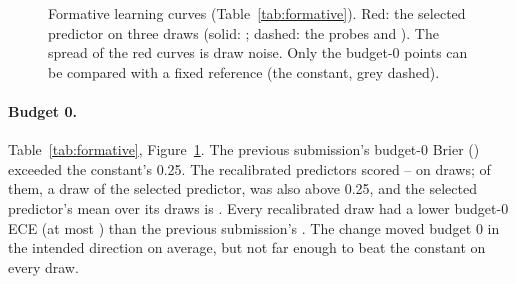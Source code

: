 \documentclass{article}
\begin{document}
\begin{table}[t]
\caption{Organiser-scored formative runs (Codabench Scoring output; means over pairs). Each run is a fresh draw of pairs on the same \FmNBenchAll{} hidden benchmarks, so rows are \emph{not} paired comparisons. \SdDrawTwoId{} and \SdDrawThreeId{} are deployment probes whose predictions are those of \SelId{} (Section~\ref{sec:items}): with \SelId{} they are \SdN{} draws of the selected predictor, whose mean is the best estimate of its level. ECE: budget-weighted summary ECE; ECE$_0$: at budget 0. The constant 0.5 scores 0.25 at every budget on any draw.}
\label{tab:formative}
\centering\footnotesize\setlength{\tabcolsep}{3pt}
\end{table}

\begin{figure}[t]
\centering
{}
\caption{Formative learning curves (Table~\ref{tab:formative}). Red: the selected predictor on three draws (solid: \SelId; dashed: the probes \SdDrawTwoId{} and \SdDrawThreeId). The spread of the red curves is draw noise. Only the budget-0 points can be compared with a fixed reference (the constant, grey dashed).}
\label{fig:formative}
\end{figure}

\paragraph{Budget 0.} Table~\ref{tab:formative}, Figure~\ref{fig:formative}. The previous submission's budget-0 Brier (\FmShipBZero) exceeded the constant's 0.25. The recalibrated predictors scored \SdRecalBZeroMin--\SdRecalBZeroMax{} on \SdRecalNRuns{} draws; \SdRecalNAbove{} of them, a draw of the selected predictor, was also above 0.25, and the selected predictor's mean over its \SdN{} draws is \SdBZeroMean. Every recalibrated draw had a lower budget-0 ECE (at most \SdRecalEceBZeroMax) than the previous submission's \FmShipEceBZero. The change moved budget 0 in the intended direction on average, but not far enough to beat the constant on every draw.
\end{document}
